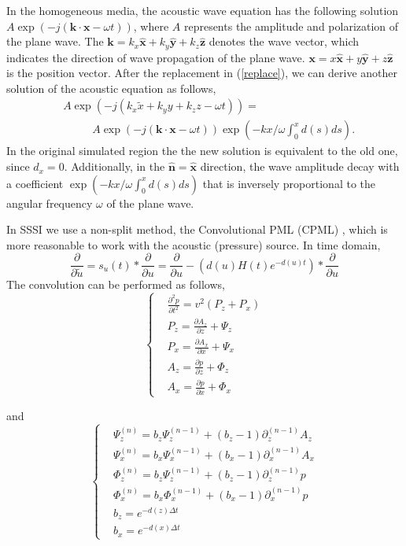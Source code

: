 \documentclass[11pt]{article}
\newcommand{\bx}{\boldsymbol{x}}
\newcommand{\bk}{\boldsymbol{k}}
\newcommand{\hx}{\hat{\mathbf{x}}}
\newcommand{\hy}{\hat{\mathbf{y}}}
\newcommand{\hz}{\hat{\mathbf{z}}}
\theoremstyle{plain}
\theoremstyle{definition}
\theoremstyle{remark}
\numberwithin{equation}{section}
\begin{document}
In the homogeneous media, the acoustic wave equation has the following solution $A \exp(-j (\bk \cdot \bx -\omega t))$, where $A$ represents the amplitude and polarization of the plane wave. The $\bk = k_x \hx + k_y \hy +k_z \hz$ denotes the wave vector, which 
indicates the direction of wave propagation of the plane wave. $\bx = x\hx +y\hy +z \hz$ is the position vector. After the replacement in (\ref{replace}), we can derive another solution of the acoustic equation as follows,
\begin{equation}
\begin{aligned}
&A\exp(-j(k_x \tilde{x} + k_y y + k_z z -\omega t))=\\
 &~~~~~~~~~~~~A\exp(-j (\bk\cdot \bx -\omega t))\exp(-kx/\omega \int_0^x d(s)ds).
\end{aligned}
\end{equation}
In the original simulated region the the new solution is equivalent to the old one, since $d_x=0$. Additionally, in the $\hat{\mathbf{n}}= \hx$ direction, the wave amplitude decay with a coefficient $\exp(-kx/\omega \int_0^x d(s)ds)$ that is inversely proportional to the angular frequency $\omega$ of the plane wave. 

In SSSI we use a non-split method, the Convolutional PML (CPML) \cite{LueHun1992, RodGed2000, KomMar2007}, which is more reasonable to work with the acoustic (pressure) source. In time domain,
  \begin{equation}
    \frac{\partial}{\partial \tilde{u}} = s_u(t) * \frac{\partial}{\partial u} = \frac{\partial}{\partial u} - \left(d(u)H(t)e^{-d(u)t}\right) * \frac{\partial}{\partial u}
  \end{equation}
The convolution can be performed as follows,
  \begin{equation}
  \left\{
  \begin{aligned}
  &\frac{\partial^2 p}{\partial t^2}=v^2(P_z+P_x)\\
  &P_z=\frac{\partial A_z}{\partial z}+\Psi_z\\
  &P_x=\frac{\partial A_x}{\partial x}+\Psi_x\\
  &A_z=\frac{\partial p}{\partial z}+\Phi_z\\
  &A_x=\frac{\partial p}{\partial x}+\Phi_x
  \end{aligned}
  \right.
  \end{equation}
  
  and  
  \begin{equation}
  \left\{
  \begin{aligned}
  &\Psi_z^{(n)}=b_z\Psi_z^{(n-1)}+(b_z-1)\partial_z^{(n-1)}A_z\\
  &\Psi_x^{(n)}=b_x\Psi_x^{(n-1)}+(b_x-1)\partial_x^{(n-1)}A_x\\
  &\Phi_z^{(n)}=b_z\Psi_z^{(n-1)}+(b_z-1)\partial_z^{(n-1)}p\\
  &\Phi_x^{(n)}=b_x\Phi_x^{(n-1)}+(b_x-1)\partial_x^{(n-1)}p\\
  &b_z = e^{-d(z)\Delta t}\\
  &b_x = e^{-d(x)\Delta t}
  \end{aligned}
  \right.
  \end{equation}
\end{document}
